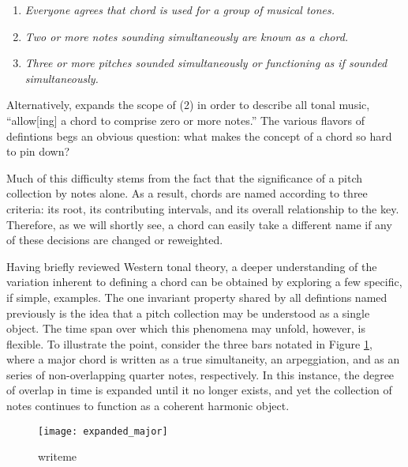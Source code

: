 \begin{enumerate}
\item \emph{Everyone agrees that \emph{chord} is used for a group of musical tones.}
\item \emph{Two or more notes sounding simultaneously are known as a chord.}
\item \emph{Three or more pitches sounded simultaneously or functioning as if sounded simultaneously.}
\end{enumerate}

Alternatively, \cite{Harte2010} expands the scope of (2) in order to describe all tonal music, ``allow[ing] a chord to comprise zero or more notes.''
The various flavors of defintions begs an obvious question: what makes the concept of a chord so hard to pin down?

Much of this difficulty stems from the fact that the significance of a pitch collection by notes alone.
As a result, chords are named according to three criteria: its root, its contributing intervals, and its overall relationship to the key.
Therefore, as we will shortly see, a chord can easily take a different name if any of these decisions are changed or reweighted.

Having briefly reviewed Western tonal theory, a deeper understanding of the variation inherent to defining a chord can be obtained by exploring a few specific, if simple, examples.
The one invariant property shared by all defintions named previously is the idea that a pitch collection may be understood as a single object.
The time span over which this phenomena may unfold, however, is flexible.
To illustrate the point, consider the three bars notated in Figure \ref{fig:expanded_major}, where a major chord is written as a true simultaneity, an arpeggiation, and as an series of non-overlapping quarter notes, respectively.
In this instance, the degree of overlap in time is expanded until it no longer exists, and yet the collection of notes continues to function as a coherent harmonic object.

\begin{figure}[h]
\centering
\texttt{[image: expanded\_major]}
\caption{writeme}
\label{fig:expanded_major}
\end{figure}

